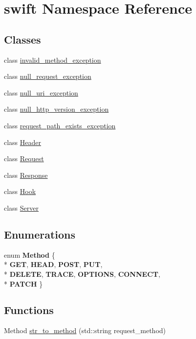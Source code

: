 \hypertarget{namespaceswift}{\section{swift Namespace Reference}
\label{namespaceswift}
}
\subsection*{Classes}
\begin{DoxyCompactItemize}
\item 
class \hyperlink{classswift_1_1invalid__method__exception}{invalid\-\_\-method\-\_\-exception}
\item 
class \hyperlink{classswift_1_1null__request__exception}{null\-\_\-request\-\_\-exception}
\item 
class \hyperlink{classswift_1_1null__uri__exception}{null\-\_\-uri\-\_\-exception}
\item 
class \hyperlink{classswift_1_1null__http__version__exception}{null\-\_\-http\-\_\-version\-\_\-exception}
\item 
class \hyperlink{classswift_1_1request__path__exists__exception}{request\-\_\-path\-\_\-exists\-\_\-exception}
\item 
class \hyperlink{classswift_1_1_header}{Header}
\item 
class \hyperlink{classswift_1_1_request}{Request}
\item 
class \hyperlink{classswift_1_1_response}{Response}
\item 
class \hyperlink{classswift_1_1_hook}{Hook}
\item 
class \hyperlink{classswift_1_1_server}{Server}
\end{DoxyCompactItemize}
\subsection*{Enumerations}
\begin{DoxyCompactItemize}
\item 
enum {\bfseries Method} \{ \\*
{\bfseries G\-E\-T}, 
{\bfseries H\-E\-A\-D}, 
{\bfseries P\-O\-S\-T}, 
{\bfseries P\-U\-T}, 
\\*
{\bfseries D\-E\-L\-E\-T\-E}, 
{\bfseries T\-R\-A\-C\-E}, 
{\bfseries O\-P\-T\-I\-O\-N\-S}, 
{\bfseries C\-O\-N\-N\-E\-C\-T}, 
\\*
{\bfseries P\-A\-T\-C\-H}
 \}
\end{DoxyCompactItemize}
\subsection*{Functions}
\begin{DoxyCompactItemize}
\item 
Method \hyperlink{namespaceswift_a54d9cafe8eb822e4a2fedef9d724a702}{str\-\_\-to\-\_\-method} (std\-::string request\-\_\-method)
\end{DoxyCompactItemize}
